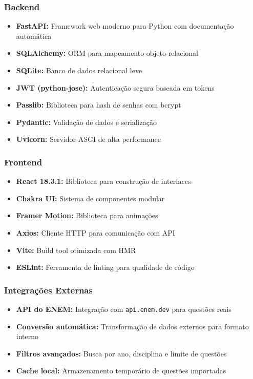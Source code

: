 \documentclass[12pt,a4paper]{article}
\begin{document}
\subsubsection{Backend}
\begin{itemize}
    \item \textbf{FastAPI:} Framework web moderno para Python com documentação automática
    \item \textbf{SQLAlchemy:} ORM para mapeamento objeto-relacional
    \item \textbf{SQLite:} Banco de dados relacional leve
    \item \textbf{JWT (python-jose):} Autenticação segura baseada em tokens
    \item \textbf{Passlib:} Biblioteca para hash de senhas com bcrypt
    \item \textbf{Pydantic:} Validação de dados e serialização
    \item \textbf{Uvicorn:} Servidor ASGI de alta performance
\end{itemize}

\subsubsection{Frontend}
\begin{itemize}
    \item \textbf{React 18.3.1:} Biblioteca para construção de interfaces
    \item \textbf{Chakra UI:} Sistema de componentes modular
    \item \textbf{Framer Motion:} Biblioteca para animações
    \item \textbf{Axios:} Cliente HTTP para comunicação com API
    \item \textbf{Vite:} Build tool otimizada com HMR
    \item \textbf{ESLint:} Ferramenta de linting para qualidade de código
\end{itemize}

\subsubsection{Integrações Externas}
\begin{itemize}
    \item \textbf{API do ENEM:} Integração com \texttt{api.enem.dev} para questões reais
    \item \textbf{Conversão automática:} Transformação de dados externos para formato interno
    \item \textbf{Filtros avançados:} Busca por ano, disciplina e limite de questões
    \item \textbf{Cache local:} Armazenamento temporário de questões importadas
\end{itemize}
\end{document}
